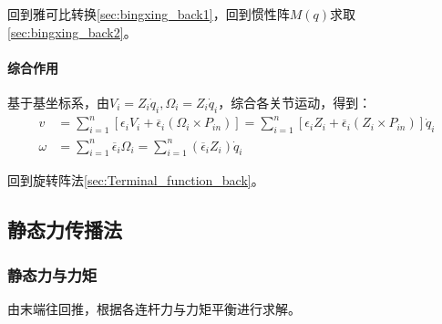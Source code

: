 \documentclass[
12pt, %
a4paper, 
oneside, %
headinclude,footinclude, %
]{scrartcl}
\begin{document}
回到雅可比转换\ref{sec:bingxing_back1}，回到惯性阵$ M(q) $求取\ref{sec:bingxing_back2}。
\paragraph{综合作用}\label{sec:Terminal_function}
基于基坐标系，由$ V_i = Z_i \dot{q}_i, \Omega_i = Z_i \dot{q}_i $，综合各关节运动，得到：
\begin{align*}
v &= \sum_{i = 1}^n [\epsilon_i V_i + \overline{\epsilon}_i (\Omega_i \times P_{in})] = \sum_{i = 1}^n [\epsilon_i Z_i + \overline{\epsilon}_i (Z_i \times P_{in})] \dot{q}_i \\
\omega &= \sum_{i = 1}^n \overline{\epsilon}_i \Omega_i = \sum_{i = 1}^n (\overline{\epsilon}_i Z_i) \dot{q}_i
\end{align*}

回到旋转阵法\ref{sec:Terminal_function_back}。
\subsection[静态力传播法]{静态力传播法}
\subsubsection[静态力与力矩]{静态力与力矩}\label{sec:fn1}
由末端往回推，根据各连杆力与力矩平衡进行求解。
\end{document}
